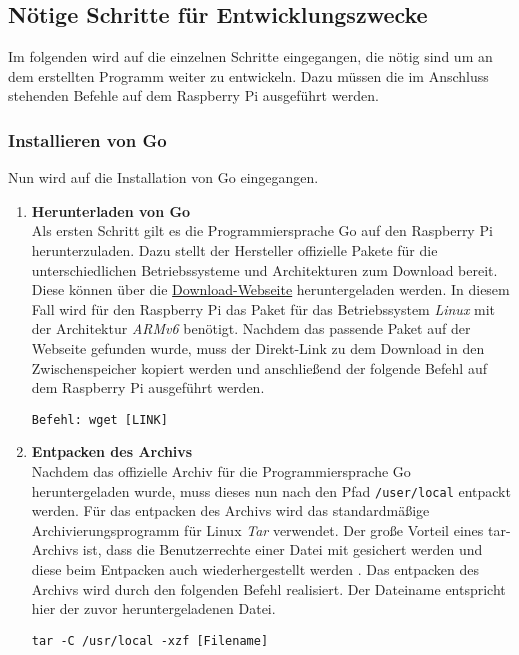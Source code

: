 \subsection{Nötige Schritte für Entwicklungszwecke}
Im folgenden wird auf die einzelnen Schritte eingegangen, die nötig sind um an
dem erstellten Programm weiter zu entwickeln. Dazu müssen die im Anschluss
stehenden Befehle auf dem Raspberry Pi ausgeführt werden.

\subsubsection{Installieren von Go}
Nun wird auf die Installation von Go eingegangen.

\begin{enumerate}
\item \textbf{Herunterladen von Go} \\
Als ersten Schritt gilt es die Programmiersprache Go auf den Raspberry Pi
herunterzuladen. Dazu stellt der Hersteller offizielle Pakete für die
unterschiedlichen Betriebssysteme und Architekturen zum Download bereit. Diese
können über die \href{https://golang.org/dl/}{Download-Webseite}
heruntergeladen werden. In diesem Fall wird für den Raspberry Pi das Paket für
das Betriebssystem \textit{Linux} mit der Architektur \textit{ARMv6} benötigt.
Nachdem das passende Paket auf der Webseite gefunden wurde, muss der
Direkt-Link zu dem Download in den Zwischenspeicher kopiert werden und
anschließend der folgende Befehl auf dem Raspberry Pi ausgeführt werden.
\begin{lstlisting}
Befehl: wget [LINK]
\end{lstlisting}

\item \textbf{Entpacken des Archivs} \\
Nachdem das offizielle Archiv für die Programmiersprache Go heruntergeladen
wurde, muss dieses nun nach den Pfad \verb|/user/local| entpackt werden. Für
das entpacken des Archivs wird das standardmäßige Archivierungsprogramm für
Linux \textit{\ac{Tar}} verwendet. Der große Vorteil eines tar-Archivs ist,
dass die Benutzerrechte einer Datei mit gesichert werden und diese beim
Entpacken auch wiederhergestellt werden \autocite{tar-wiki_2019}. Das entpacken
des Archivs wird durch den folgenden Befehl realisiert. Der Dateiname
entspricht hier der zuvor heruntergeladenen Datei.
\begin{lstlisting}
tar -C /usr/local -xzf [Filename]
\end{lstlisting}


\end{enumerate}
